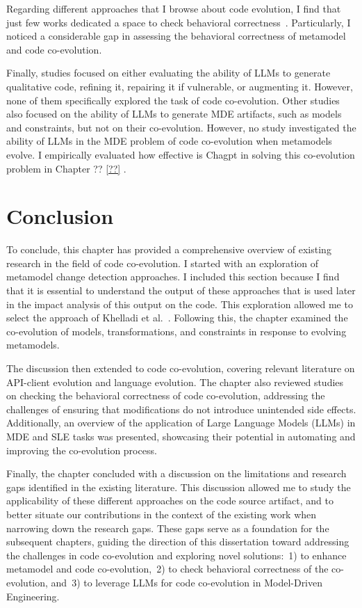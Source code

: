   Regarding different approaches that I browse about code evolution, I find that just few works dedicated a space to check behavioral correctness~\cite{10.1145/3387905.3388608,correa2007refactoring, kusel2015systematic}. Particularly, I noticed a considerable gap in assessing the behavioral correctness of metamodel and code co-evolution.
  
  Finally, studies focused on either evaluating the ability of LLMs to generate qualitative code, refining it, repairing it if vulnerable, or augmenting it. However, none of them specifically explored the task of code co-evolution.
  Other studies also focused on the ability of LLMs to generate MDE artifacts, such as models and constraints, but not on their co-evolution. However, no study investigated the ability of LLMs in the MDE problem of code co-evolution when metamodels evolve. I empirically evaluated how effective is Chagpt in solving this co-evolution problem in Chapter ?? \ref{??} .
  
  \section{Conclusion}
  To conclude, this chapter has provided a comprehensive overview of existing research in the field of code co-evolution. I started with an exploration of metamodel change detection approaches. I included this section because I find that it is essential to understand the output of these approaches that is used later in the impact analysis of this output on the code. This exploration allowed me to select the approach of Khelladi et al.~\cite{khe}. Following this, the chapter examined the co-evolution of models, transformations, and constraints in response to evolving metamodels.
  
  The discussion then extended to code co-evolution, covering relevant literature on API-client evolution and language evolution. The chapter also reviewed studies on checking the behavioral correctness of code co-evolution, addressing the challenges of ensuring that modifications do not introduce unintended side effects. Additionally, an overview of the application of Large Language Models (LLMs) in MDE and SLE tasks was presented, showcasing their potential in automating and improving the co-evolution process.
  
  Finally, the chapter concluded with a discussion on the limitations and research gaps identified in the existing literature. This discussion allowed me to study the applicability of these different approaches on the code source artifact, and to better situate our contributions in the context of the existing work when narrowing down the research gaps. These gaps serve as a foundation for the subsequent chapters, guiding the direction of this dissertation toward addressing the challenges in code co-evolution and exploring novel solutions:~1) to enhance metamodel and code co-evolution,~2) to check behavioral correctness of the co-evolution, and~3) to leverage LLMs for code co-evolution in Model-Driven Engineering.

